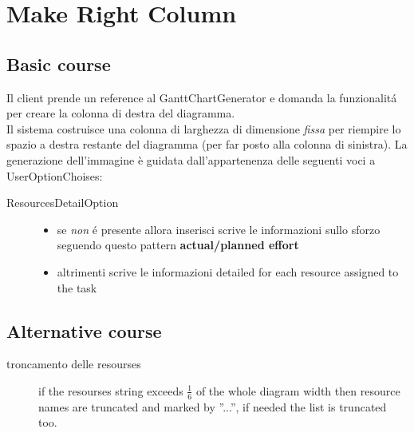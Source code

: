\section{Make Right Column}
\label{seq:GanttRightRepresentation}
\subsection{Basic course}
Il client prende un reference al GanttChartGenerator e domanda la funzionalit\'a
per creare la colonna di destra del diagramma. \\
Il sistema costruisce una colonna di larghezza di dimensione \emph{fissa} per 
riempire lo spazio a destra restante del diagramma (per far posto alla colonna
di sinistra). La generazione dell'immagine \`e guidata dall'appartenenza delle
seguenti voci a UserOptionChoises:
\begin{description}
\item[ResourcesDetailOption] \quad
\begin{itemize}
  \item se \emph{non} \'e presente allora inserisci scrive le informazioni
  sullo sforzo seguendo questo pattern \textbf{actual/planned effort}
  \item altrimenti scrive le informazioni detailed for each resource assigned to
  the task
\end{itemize}
\end{description}

\subsection{Alternative course}
\begin{description}
\item[troncamento delle resourses] if the resourses string exceeds $\frac{1}{6}$
of the whole diagram width then resource names are truncated and marked by ''...'', if
needed the list is truncated too.

\end{description}